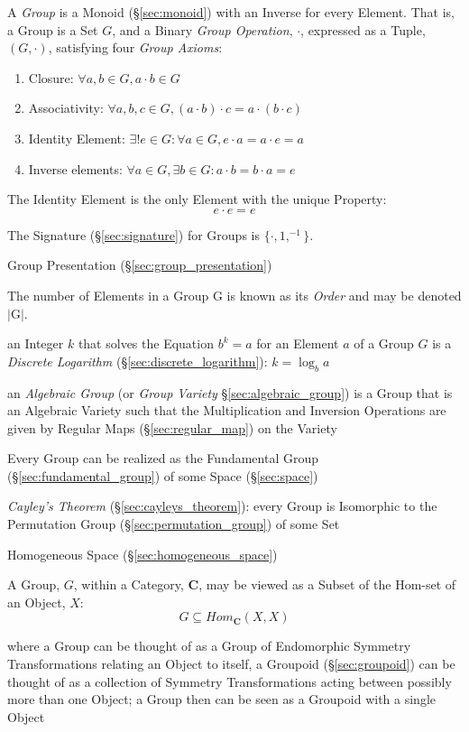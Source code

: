 A \emph{Group} is a Monoid (\S\ref{sec:monoid}) with an Inverse for
every Element. That is, a Group is a Set $G$, and a Binary \emph{Group
  Operation}, $\cdot$, expressed as a Tuple, $(G,\cdot)$, satisfying
four \emph{Group Axioms}:
\begin{enumerate}
    \item Closure: $\forall a,b \in G, a \cdot b \in G$
    \item Associativity: $\forall a,b,c \in G, (a \cdot b) \cdot c = a
      \cdot (b \cdot c)$
    \item Identity Element: $\exists! e \in G : \forall a \in G,
      e \cdot a = a \cdot e = a$
    \item Inverse elements: $\forall a \in G, \exists b \in G :
      a \cdot b = b \cdot a = e$
\end{enumerate}
The Identity Element is the only Element with the unique Property:
\[
    e \cdot e = e
\]

The Signature (\S\ref{sec:signature}) for Groups is $\{\cdot, 1,
^{-1}\}$.

\fist Group Presentation (\S\ref{sec:group_presentation})

The number of Elements in a Group $\mathrm{G}$ is known as its
\emph{Order} and may be denoted $|\mathrm{G}|$.

an Integer $k$ that solves the Equation $b^k = a$ for an Element $a$ of a Group
$G$ is a \emph{Discrete Logarithm} (\S\ref{sec:discrete_logarithm}): $k = \log_b
a$

\fist an \emph{Algebraic Group} (or \emph{Group Variety}
\S\ref{sec:algebraic_group}) is a Group that is an Algebraic Variety such that
the Multiplication and Inversion Operations are given by Regular Maps
(\S\ref{sec:regular_map}) on the Variety

Every Group can be realized as the Fundamental Group
(\S\ref{sec:fundamental_group}) of some Space (\S\ref{sec:space})

\emph{Cayley's Theorem} (\S\ref{sec:cayleys_theorem}): every Group is
Isomorphic to the Permutation Group (\S\ref{sec:permutation_group}) of
some Set

\fist Homogeneous Space (\S\ref{sec:homogeneous_space})

A Group, $G$, within a Category, $\mathbf{C}$, may be viewed as a
Subset of the Hom-set of an Object, $X$:
\[
    G \subseteq Hom_{\mathbf{C}}(X,X)
\]

\fist where a Group can be thought of as a Group of Endomorphic Symmetry
Transformations relating an Object to itself, a Groupoid (\S\ref{sec:groupoid})
can be thought of as a collection of Symmetry Transformations acting between
possibly more than one Object; a Group then can be seen as a Groupoid with a
single Object



